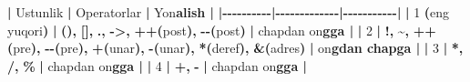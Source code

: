 \documentclass[a4paper,11pt,twoside,openright]{book}
\newenvironment{Shaded}{\begin{snugshade}}{\end{snugshade}}
\newcommand{\CharTok}[1]{\textcolor[rgb]{0.31,0.60,0.02}{#1}}
\newcommand{\DecValTok}[1]{\textcolor[rgb]{0.00,0.00,0.81}{#1}}
\newcommand{\ErrorTok}[1]{\textcolor[rgb]{0.64,0.00,0.00}{\textbf{#1}}}
\newcommand{\NormalTok}[1]{#1}
\newcommand{\OperatorTok}[1]{\textcolor[rgb]{0.81,0.36,0.00}{\textbf{#1}}}
\begin{document}
\begin{Shaded}
\begin{Highlighting}[]
\OperatorTok{|}\NormalTok{ Ustunlik }\OperatorTok{|}\NormalTok{ Operatorlar }\OperatorTok{|}\NormalTok{ Yo}\CharTok{\textquotesingle{}n}\ErrorTok{alish |}
\OperatorTok{|{-}{-}{-}{-}{-}{-}{-}{-}{-}{-}|{-}{-}{-}{-}{-}{-}{-}{-}{-}{-}{-}{-}{-}|{-}{-}{-}{-}{-}{-}{-}{-}{-}{-}{-}|}
\OperatorTok{|} \DecValTok{1} \OperatorTok{(}\NormalTok{eng yuqori}\OperatorTok{)} \OperatorTok{|} \ErrorTok{\textasciigrave{}}\OperatorTok{()}\ErrorTok{\textasciigrave{}}\OperatorTok{,} \ErrorTok{\textasciigrave{}}\OperatorTok{[]}\ErrorTok{\textasciigrave{}}\OperatorTok{,} \ErrorTok{\textasciigrave{}}\OperatorTok{.}\ErrorTok{\textasciigrave{}}\OperatorTok{,} \ErrorTok{\textasciigrave{}}\OperatorTok{{-}\textgreater{}}\ErrorTok{\textasciigrave{}}\OperatorTok{,} \ErrorTok{\textasciigrave{}}\OperatorTok{++}\ErrorTok{\textasciigrave{}}\OperatorTok{(}\NormalTok{post}\OperatorTok{),} \ErrorTok{\textasciigrave{}}\OperatorTok{{-}{-}}\ErrorTok{\textasciigrave{}}\OperatorTok{(}\NormalTok{post}\OperatorTok{)} \OperatorTok{|}\NormalTok{ chapdan o}\CharTok{\textquotesingle{}n}\ErrorTok{gga |}
\OperatorTok{|} \DecValTok{2} \OperatorTok{|} \ErrorTok{\textasciigrave{}}\OperatorTok{!}\ErrorTok{\textasciigrave{}}\OperatorTok{,} \ErrorTok{\textasciigrave{}}\OperatorTok{\textasciitilde{}}\ErrorTok{\textasciigrave{}}\OperatorTok{,} \ErrorTok{\textasciigrave{}}\OperatorTok{++}\ErrorTok{\textasciigrave{}}\OperatorTok{(}\NormalTok{pre}\OperatorTok{),} \ErrorTok{\textasciigrave{}}\OperatorTok{{-}{-}}\ErrorTok{\textasciigrave{}}\OperatorTok{(}\NormalTok{pre}\OperatorTok{),} \ErrorTok{\textasciigrave{}}\OperatorTok{+}\ErrorTok{\textasciigrave{}}\OperatorTok{(}\NormalTok{unar}\OperatorTok{),} \ErrorTok{\textasciigrave{}}\OperatorTok{{-}}\ErrorTok{\textasciigrave{}}\OperatorTok{(}\NormalTok{unar}\OperatorTok{),} \ErrorTok{\textasciigrave{}}\OperatorTok{*}\ErrorTok{\textasciigrave{}}\OperatorTok{(}\NormalTok{deref}\OperatorTok{),} \ErrorTok{\textasciigrave{}}\OperatorTok{\&}\ErrorTok{\textasciigrave{}}\OperatorTok{(}\NormalTok{adres}\OperatorTok{)} \OperatorTok{|}\NormalTok{ o}\CharTok{\textquotesingle{}n}\ErrorTok{gdan chapga |}
\OperatorTok{|} \DecValTok{3} \OperatorTok{|} \ErrorTok{\textasciigrave{}}\OperatorTok{*}\ErrorTok{\textasciigrave{}}\OperatorTok{,} \ErrorTok{\textasciigrave{}}\OperatorTok{/}\ErrorTok{\textasciigrave{}}\OperatorTok{,} \ErrorTok{\textasciigrave{}}\OperatorTok{\%}\ErrorTok{\textasciigrave{}} \OperatorTok{|}\NormalTok{ chapdan o}\CharTok{\textquotesingle{}n}\ErrorTok{gga |}
\OperatorTok{|} \DecValTok{4} \OperatorTok{|} \ErrorTok{\textasciigrave{}}\OperatorTok{+}\ErrorTok{\textasciigrave{}}\OperatorTok{,} \ErrorTok{\textasciigrave{}}\OperatorTok{{-}}\ErrorTok{\textasciigrave{}} \OperatorTok{|}\NormalTok{ chapdan o}\CharTok{\textquotesingle{}n}\ErrorTok{gga |}

\end{Highlighting}
\end{Shaded}
\end{document}
